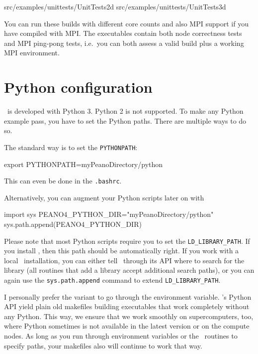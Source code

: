 \begin{code}
  src/examples/unittests/UnitTests2d
  src/examples/unittests/UnitTests3d
\end{code}

\noindent
You can run these builds with different core counts and also MPI support if you
have compiled with MPI.
The executables contain both node correctness tests and MPI ping-pong tests,
i.e.~you can both assess a valid build plus a working MPI environment.



\section{Python configuration}

\Peano\ is developed with Python 3. Python 2 is not supported. 
To make any Python example pass, you have to set the Python paths.
There are multiple ways to do so.

The standard way is to set the \texttt{PYTHONPATH}:
\begin{code}
export PYTHONPATH=myPeanoDirectory/python
\end{code}
This can even be done in the \texttt{.bashrc}.

Alternatively, you can augment your Python scripts later on with 
\begin{code}
import sys
PEANO4_PYTHON_DIR="myPeanoDirectory/python"
sys.path.append(PEANO4_PYTHON_DIR)
\end{code}


\noindent
Please note that most Python scripts require you to set the
\texttt{LD\_LIBRARY\_PATH}. 
If you install \Peano, then this path should be automatically right.
If you work with a local \Peano\ installation, you can either tell \Peano\
through its API where to search for the library (all routines that add a
library accept additional search paths), or you can again use the
\texttt{sys.path.append} command to extend \texttt{LD\_LIBRARY\_PATH}.


\begin{remark}
 I personally prefer the variant to go through the environment variable.
 \Peano's Python API yield plain old makefiles building executables that work
 completely without any Python. 
 This way, we ensure that we work smoothly on supercomputers, too, where Python
 sometimes is not available in the latest version or on the compute nodes.
 As long as you run through environment variables or the \Peano\ routines to
 specify paths, your makefiles also will continue to work that way. 
\end{remark}



